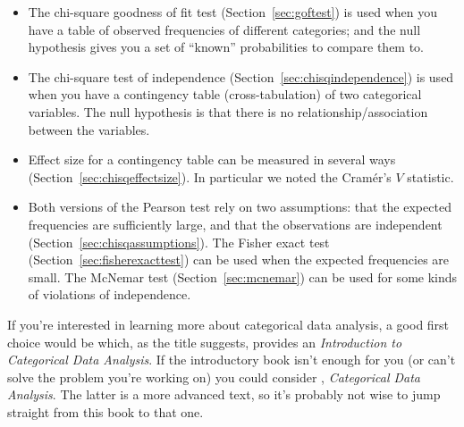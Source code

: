 \begin{itemize}
\item The chi-square goodness of fit test (Section~\ref{sec:goftest}) is used when you have a table of observed frequencies of different categories; and the null hypothesis gives you a set of ``known'' probabilities to compare them to. 
\item The chi-square test of independence (Section~\ref{sec:chisqindependence}) is used when you have a contingency table (cross-tabulation) of two categorical variables. The null hypothesis is that there is no relationship/association between the variables. 
\item Effect size for a contingency table can be measured in several ways (Section~\ref{sec:chisqeffectsize}). In particular we noted the Cram\'er's $V$ statistic.
\item Both versions of the Pearson test rely on two assumptions: that the expected frequencies are sufficiently large, and that the observations are independent (Section~\ref{sec:chisqassumptions}). The Fisher exact test (Section~\ref{sec:fisherexacttest}) can be used when the expected frequencies are small. The McNemar test (Section~\ref{sec:mcnemar}) can be used for some kinds of violations of independence. 
\end{itemize}

\noindent
If you're interested in learning more about categorical data analysis, a good first choice would be \textcite{Agresti1996} which, as the title suggests, provides an {\it Introduction to Categorical Data Analysis}. If the introductory book isn't enough for you (or can't solve the problem you're working on) you could consider \textcite{Agresti2002}, {\it Categorical Data Analysis}. The latter is a more advanced text, so it's probably not wise to jump straight from this book to that one. 


